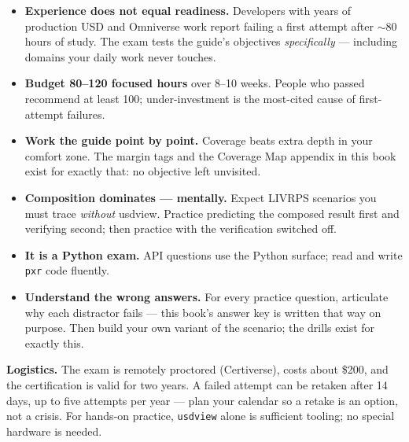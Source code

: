 \begin{itemize}[leftmargin=*]
  \item \textbf{Experience does not equal readiness.} Developers with years
        of production USD and Omniverse work report failing a first attempt
        after $\sim$80 hours of study. The exam tests the guide's objectives
        \emph{specifically} --- including domains your daily work never
        touches.
  \item \textbf{Budget 80--120 focused hours} over 8--10 weeks. People who
        passed recommend at least 100; under-investment is the most-cited
        cause of first-attempt failures.
  \item \textbf{Work the guide point by point.} Coverage beats extra depth in
        your comfort zone. The margin tags and the Coverage Map appendix in
        this book exist for exactly that: no objective left unvisited.
  \item \textbf{Composition dominates --- mentally.} Expect LIVRPS scenarios
        you must trace \emph{without} usdview. Practice predicting the
        composed result first and verifying second; then practice with the
        verification switched off.
  \item \textbf{It is a Python exam.} API questions use the Python surface;
        read and write \texttt{pxr} code fluently.
  \item \textbf{Understand the wrong answers.} For every practice question,
        articulate why each distractor fails --- this book's answer key is
        written that way on purpose. Then build your own variant of the
        scenario; the drills exist for exactly this.
\end{itemize}

\noindent\textbf{Logistics.} The exam is remotely proctored (Certiverse),
costs about \$200, and the certification is valid for two years. A failed
attempt can be retaken after 14 days, up to five attempts per year --- plan
your calendar so a retake is an option, not a crisis. For hands-on practice,
\texttt{usdview} alone is sufficient tooling; no special hardware is needed.
